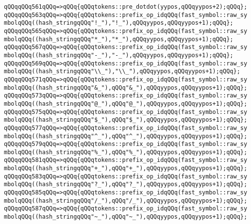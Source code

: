\verb|qQQqqQQq561qQQq=>qQQq{qQQqtokens::pre_dotdot(yypos,qQQqyypos+2);qQQq};|\newline
\verb|qQQqqQQq563qQQq=>qQQq{qQQqtokens::prefix_op_idqQQq(fast_symbol::raw_symbolqQQq((hash_stringqQQq"!_"),"!_"),qQQqyypos,qQQqyypos+1);qQQq};|\newline
\verb|qQQqqQQq565qQQq=>qQQq{qQQqtokens::prefix_op_idqQQq(fast_symbol::raw_symbolqQQq((hash_stringqQQq"*_"),"*_"),qQQqyypos,qQQqyypos+1);qQQq};|\newline
\verb|qQQqqQQq567qQQq=>qQQq{qQQqtokens::prefix_op_idqQQq(fast_symbol::raw_symbolqQQq((hash_stringqQQq"-_"),"-_"),qQQqyypos,qQQqyypos+1);qQQq};|\newline
\verb|qQQqqQQq569qQQq=>qQQq{qQQqtokens::prefix_op_idqQQq(fast_symbol::raw_symbolqQQq((hash_stringqQQq"\\_"),"\\_"),qQQqyypos,qQQqyypos+1);qQQq};|\newline
\verb|qQQqqQQq571qQQq=>qQQq{qQQqtokens::prefix_op_idqQQq(fast_symbol::raw_symbolqQQq((hash_stringqQQq"&_"),qQQq"&_"),qQQqyypos,qQQqyypos+1);qQQq};|\newline
\verb|qQQqqQQq573qQQq=>qQQq{qQQqtokens::prefix_op_idqQQq(fast_symbol::raw_symbolqQQq((hash_stringqQQq"@_"),qQQq"@_"),qQQqyypos,qQQqyypos+1);qQQq};|\newline
\verb|qQQqqQQq575qQQq=>qQQq{qQQqtokens::prefix_op_idqQQq(fast_symbol::raw_symbolqQQq((hash_stringqQQq"$_"),qQQq"$_"),qQQqyypos,qQQqyypos+1);qQQq};|\newline
\verb|qQQqqQQq577qQQq=>qQQq{qQQqtokens::prefix_op_idqQQq(fast_symbol::raw_symbolqQQq((hash_stringqQQq"^_"),qQQq"^_"),qQQqyypos,qQQqyypos+1);qQQq};|\newline
\verb|qQQqqQQq579qQQq=>qQQq{qQQqtokens::prefix_op_idqQQq(fast_symbol::raw_symbolqQQq((hash_stringqQQq"%_"),qQQq"%_"),qQQqyypos,qQQqyypos+1);qQQq};|\newline
\verb|qQQqqQQq581qQQq=>qQQq{qQQqtokens::prefix_op_idqQQq(fast_symbol::raw_symbolqQQq((hash_stringqQQq"+_"),qQQq"+_"),qQQqyypos,qQQqyypos+1);qQQq};|\newline
\verb|qQQqqQQq583qQQq=>qQQq{qQQqtokens::prefix_op_idqQQq(fast_symbol::raw_symbolqQQq((hash_stringqQQq"?_"),qQQq"?_"),qQQqyypos,qQQqyypos+1);qQQq};|\newline
\verb|qQQqqQQq585qQQq=>qQQq{qQQqtokens::prefix_op_idqQQq(fast_symbol::raw_symbolqQQq((hash_stringqQQq"/_"),qQQq"/_"),qQQqyypos,qQQqyypos+1);qQQq};|\newline
\verb|qQQqqQQq587qQQq=>qQQq{qQQqtokens::prefix_op_idqQQq(fast_symbol::raw_symbolqQQq((hash_stringqQQq"~_"),qQQq"~_"),qQQqyypos,qQQqyypos+1);qQQq};|\newline
